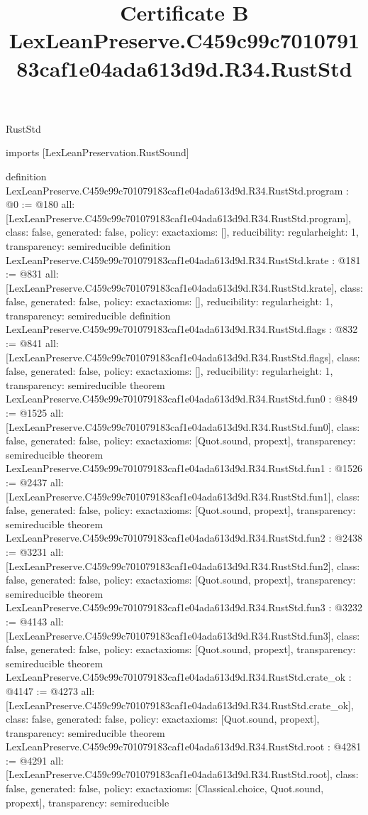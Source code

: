 \begin{lexlean}{RustStd}
\title{Certificate B LexLeanPreserve.C459c99c701079183caf1e04ada613d9d.R34.RustStd}
\begin{coremodule}
imports [LexLeanPreservation.RustSound]

definition LexLeanPreserve.C459c99c701079183caf1e04ada613d9d.R34.RustStd.program : @0 := @180 {
  all: [LexLeanPreserve.C459c99c701079183caf1e04ada613d9d.R34.RustStd.program],
  class: false,
  generated: false,
  policy: exact{axioms: []},
  reducibility: regular{height: 1},
  transparency: semireducible
}
definition LexLeanPreserve.C459c99c701079183caf1e04ada613d9d.R34.RustStd.krate : @181 := @831 {
  all: [LexLeanPreserve.C459c99c701079183caf1e04ada613d9d.R34.RustStd.krate],
  class: false,
  generated: false,
  policy: exact{axioms: []},
  reducibility: regular{height: 1},
  transparency: semireducible
}
definition LexLeanPreserve.C459c99c701079183caf1e04ada613d9d.R34.RustStd.flags : @832 := @841 {
  all: [LexLeanPreserve.C459c99c701079183caf1e04ada613d9d.R34.RustStd.flags],
  class: false,
  generated: false,
  policy: exact{axioms: []},
  reducibility: regular{height: 1},
  transparency: semireducible
}
theorem LexLeanPreserve.C459c99c701079183caf1e04ada613d9d.R34.RustStd.fun0 : @849 := @1525 {
  all: [LexLeanPreserve.C459c99c701079183caf1e04ada613d9d.R34.RustStd.fun0],
  class: false,
  generated: false,
  policy: exact{axioms: [Quot.sound, propext]},
  transparency: semireducible
}
theorem LexLeanPreserve.C459c99c701079183caf1e04ada613d9d.R34.RustStd.fun1 : @1526 := @2437 {
  all: [LexLeanPreserve.C459c99c701079183caf1e04ada613d9d.R34.RustStd.fun1],
  class: false,
  generated: false,
  policy: exact{axioms: [Quot.sound, propext]},
  transparency: semireducible
}
theorem LexLeanPreserve.C459c99c701079183caf1e04ada613d9d.R34.RustStd.fun2 : @2438 := @3231 {
  all: [LexLeanPreserve.C459c99c701079183caf1e04ada613d9d.R34.RustStd.fun2],
  class: false,
  generated: false,
  policy: exact{axioms: [Quot.sound, propext]},
  transparency: semireducible
}
theorem LexLeanPreserve.C459c99c701079183caf1e04ada613d9d.R34.RustStd.fun3 : @3232 := @4143 {
  all: [LexLeanPreserve.C459c99c701079183caf1e04ada613d9d.R34.RustStd.fun3],
  class: false,
  generated: false,
  policy: exact{axioms: [Quot.sound, propext]},
  transparency: semireducible
}
theorem LexLeanPreserve.C459c99c701079183caf1e04ada613d9d.R34.RustStd.crate_ok : @4147 := @4273 {
  all: [LexLeanPreserve.C459c99c701079183caf1e04ada613d9d.R34.RustStd.crate_ok],
  class: false,
  generated: false,
  policy: exact{axioms: [Quot.sound, propext]},
  transparency: semireducible
}
theorem LexLeanPreserve.C459c99c701079183caf1e04ada613d9d.R34.RustStd.root : @4281 := @4291 {
  all: [LexLeanPreserve.C459c99c701079183caf1e04ada613d9d.R34.RustStd.root],
  class: false,
  generated: false,
  policy: exact{axioms: [Classical.choice, Quot.sound, propext]},
  transparency: semireducible
}


\end{coremodule}
\end{lexlean}

